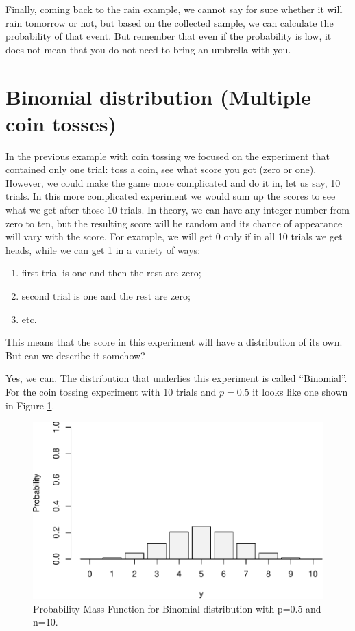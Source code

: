 \documentclass[
]{book}
\providecommand{\tightlist}{%
  \setlength{\itemsep}{0pt}\setlength{\parskip}{0pt}}
\theoremstyle{definition}
\theoremstyle{definition}
\theoremstyle{definition}
\theoremstyle{definition}
\theoremstyle{remark}
\begin{document}
Finally, coming back to the rain example, we cannot say for sure whether it will rain tomorrow or not, but based on the collected sample, we can calculate the probability of that event. But remember that even if the probability is low, it does not mean that you do not need to bring an umbrella with you.

\section{Binomial distribution (Multiple coin tosses)}\label{distributionBinomial}

In the previous example with coin tossing we focused on the experiment that contained only one trial: toss a coin, see what score you got (zero or one). However, we could make the game more complicated and do it in, let us say, 10 trials. In this more complicated experiment we would sum up the scores to see what we get after those 10 trials. In theory, we can have any integer number from zero to ten, but the resulting score will be random and its chance of appearance will vary with the score. For example, we will get 0 only if in all 10 trials we get heads, while we can get 1 in a variety of ways:

\begin{enumerate}
\def\labelenumi{\arabic{enumi}.}
\tightlist
\item
  first trial is one and then the rest are zero;
\item
  second trial is one and the rest are zero;
\item
  etc.
\end{enumerate}

This means that the score in this experiment will have a distribution of its own. But can we describe it somehow?

Yes, we can. The distribution that underlies this experiment is called ``Binomial''. For the coin tossing experiment with 10 trials and \(p=0.5\) it looks like one shown in Figure \ref{fig:binomialPMF05}.

\begin{figure}
\centering
\includegraphics{Svetunkov---Statistics-for-Business-Analytics_files/figure-latex/binomialPMF05-1.pdf}
\caption{\label{fig:binomialPMF05}Probability Mass Function for Binomial distribution with p=0.5 and n=10.}
\end{figure}
\end{document}
